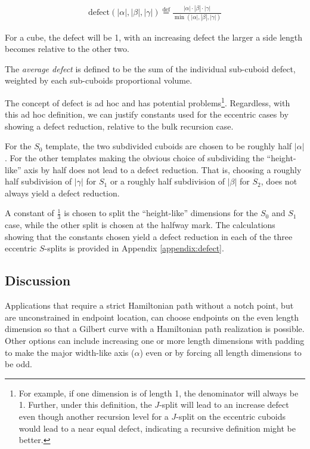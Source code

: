 $$
\begin{array}{l}
  \text{defect}(|\alpha|, |\beta|, |\gamma|) \overset{\mathrm{def}}{=} \frac{ |\alpha| \cdot |\beta| \cdot |\gamma| }{ \min(|\alpha|, |\beta|, |\gamma|) }
\end{array}
$$

For a cube, the defect will be 1, with an increasing defect the larger a side length becomes relative to the other two.

The \textit{average defect} is defined to be the sum of the individual sub-cuboid defect, weighted by each sub-cuboids proportional
volume.

The concept of defect is ad hoc and has potential problems\footnote{For example,
if one dimension is of length 1, the denominator will always be 1.
Further, under this definition, the $J$-split will lead to an increase defect even though another recursion level for a $J$-split on the eccentric
cuboids would lead to a near equal defect, indicating a recursive definition might be better.}.
Regardless, with this ad hoc definition, we can justify constants used for the eccentric cases by showing a defect reduction, relative
to the bulk recursion case.

For the $S_0$ template, the two subdivided cuboids are chosen to be roughly half $|\alpha|$.
For the other templates making the obvious choice of subdividing the ``height-like'' axis by half does
not lead to a defect reduction.
That is, choosing a roughly half subdivision of $|\gamma|$ for $S_1$ or a roughly half subdivision of $|\beta|$ for $S_2$, does
not always yield a defect reduction.

A constant of $\frac{1}{3}$ is chosen to split the ``height-like'' dimensions for the $S_0$ and $S_1$ case,
while the other split is chosen at the halfway mark.
The calculations showing that the constants chosen yield a defect reduction in each of the three eccentric $S$-splits is provided in Appendix \ref{appendix:defect}.

\subsection{Discussion}

Applications that require a strict Hamiltonian path without a notch point, but are unconstrained in endpoint location, can choose
endpoints on the even length dimension so that a Gilbert curve with a Hamiltonian path realization is possible.
Other options can include increasing one or more length dimensions with padding to make the major width-like axis ($\alpha$) even or
by forcing all length dimensions to be odd.

